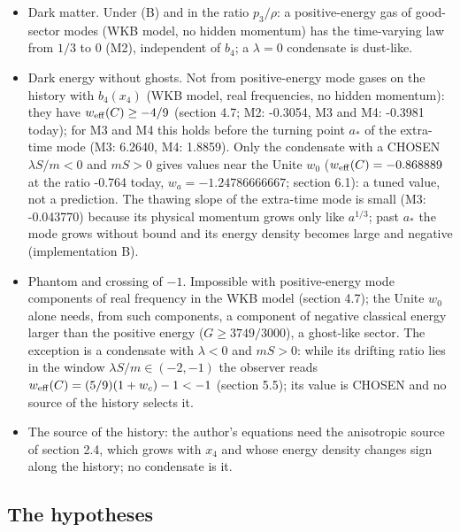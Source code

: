 \documentclass[11pt]{article}
\begin{document}
\begin{itemize}
\item Dark matter. Under (B) and in the ratio $p_3/\rho$: a positive-energy gas of good-sector modes (WKB model, no hidden momentum) has the time-varying law from $1/3$ to 0 (M2), independent of $b_4$; a $\lambda = 0$ condensate is dust-like.
\item Dark energy without ghosts. Not from positive-energy mode gases on the history with $b_4(x_4)$ (WKB model, real frequencies, no hidden momentum): they have $w_{\rm eff}(C) \geq -4/9$ (section 4.7; M2: -0.3054, M3 and M4: -0.3981 today); for M3 and M4 this holds before the turning point $a_*$ of the extra-time mode (M3: 6.2640, M4: 1.8859). Only the condensate with a CHOSEN $\lambda S/m < 0$ and $mS > 0$ gives values near the Unite $w_0$ ($w_{\rm eff}(C) = -0.868889$ at the ratio -0.764 today, $w_a = -1.24786666667$; section 6.1): a tuned value, not a prediction. The thawing slope of the extra-time mode is small (M3: -0.043770) because its physical momentum grows only like $a^{1/3}$; past $a_*$ the mode grows without bound and its energy density becomes large and negative (implementation B).
\item Phantom and crossing of $-1$. Impossible with positive-energy mode components of real frequency in the WKB model (section 4.7); the Unite $w_0$ alone needs, from such components, a component of negative classical energy larger than the positive energy ($G \geq 3749/3000$), a ghost-like sector. The exception is a condensate with $\lambda < 0$ and $mS > 0$: while its drifting ratio lies in the window $\lambda S/m \in (-2, -1)$ the observer reads $w_{\rm eff}(C) = (5/9)(1 + w_c) - 1 < -1$ (section 5.5); its value is CHOSEN and no source of the history selects it.
\item The source of the history: the author's equations need the anisotropic source of section 2.4, which grows with $x_4$ and whose energy density changes sign along the history; no condensate is it.
\end{itemize}

\subsection{The hypotheses}
\end{document}
